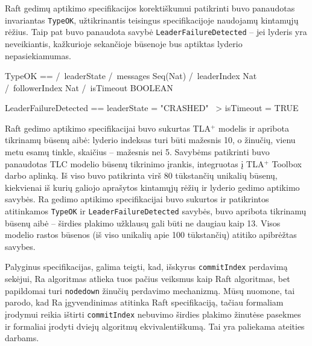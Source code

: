 \documentclass{VUMIFPSkursinis}
\begin{document}
Raft gedimų aptikimo specifikacijos korektiškumui patikrinti buvo panaudotas invariantas \texttt{TypeOK}, užtikrinantis teisingus specifikacijoje naudojamų kintamųjų rėžius. Taip pat buvo panaudota savybė \texttt{LeaderFailureDetected} -- jei lyderis yra neveikiantis, kažkurioje sekančioje būsenoje bus aptiktas lyderio nepasiekiamumas.

\begin{adjustwidth}{2cm}{}

\begin{tla}
TypeOK == /\ leaderState 
          /\ messages \in Seq(Nat)
          /\ leaderIndex \in Nat
          /\ followerIndex \in Nat      
          /\ isTimeout \in BOOLEAN

LeaderFailureDetected == leaderState = "CRASHED" ~> isTimeout = TRUE
\end{tla}
\begin{tlatex}
\@pvspace{8.0pt}%

%
%
%
%
%
\@pvspace{8.0pt}%
%

\@pvspace{8.0pt}%
\end{tlatex}

\end{adjustwidth}

Raft gedimo aptikimo specifikacijai buvo sukurtas TLA$^+$ modelis ir apribota tikrinamų būsenų aibė: lyderio indeksas turi būti mažesnis 10, o žinučių, vienu metu esamų tinkle, skaičius -- mažesnis nei 5. Savybėms patikrinti buvo panaudotas TLC modelio būsenų tikrinimo įrankis, integruotas į TLA$^+$ Toolbox darbo aplinką. Iš viso buvo patikrinta virš 80 tūkstančių unikalių būsenų, kiekvienai iš kurių galiojo aprašytos kintamųjų rėžių ir lyderio gedimo aptikimo savybės. Ra gedimo aptikimo specifikacijai buvo sukurtos ir patikrintos atitinkamos \texttt{TypeOK} ir \texttt{LeaderFailureDetected} savybės, buvo apribota tikrinamų būsenų aibė -- širdies plakimo užklausų gali būti ne daugiau kaip 13. Visos modelio rastos būsenos (iš viso unikalių apie 100 tūkstančių) atitiko apibrėžtas savybes. 

Palyginus specifikacijas, galima teigti, kad, išskyrus \texttt{commitIndex} perdavimą sekėjui, Ra algoritmas atlieka tuos pačius veiksmus kaip Raft algoritmas, bet papildomai turi \texttt{nodedown} žinučių perdavimo mechanizmą. Mūsų nuomone, tai parodo, kad Ra įgyvendinimas atitinka Raft specifikaciją, tačiau formaliam įrodymui reikia ištirti \texttt{commitIndex} nebuvimo širdies plakimo žinutėse pasekmes ir formaliai įrodyti dviejų algoritmų ekvivalentiškumą. Tai yra paliekama ateities darbams.
\end{document}
